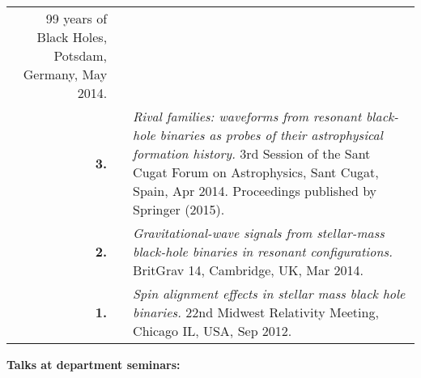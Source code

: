 \documentclass[11pt,letterpaper,sans]{moderncv}   %
\begin{document}
{\begin{longtable}{rp{0.4cm}p{15.8cm}}
99 years of Black Holes, Potsdam, Germany, May 2014.
\vspace{0.05cm}\\
%
\textbf{3.} & & \textit{Rival families: waveforms from resonant black-hole binaries as probes of their astrophysical formation history.}
\newline{} 
3rd Session of the Sant Cugat Forum on Astrophysics, Sant Cugat, Spain, Apr 2014.
\newline{} 
Proceedings published by Springer (2015).
\vspace{0.05cm}\\
%
\textbf{2.} & & \textit{Gravitational-wave signals from stellar-mass black-hole binaries in resonant configurations.}
\newline{} 
BritGrav 14, Cambridge, UK, Mar 2014.
\vspace{0.05cm}\\
%
\textbf{1.} & & \textit{Spin alignment effects in stellar mass black hole binaries.}
\newline{} 
22nd Midwest Relativity Meeting, Chicago IL, USA, Sep 2012.
\vspace{0.05cm}\\
\end{longtable}
}

\textcolor{color1}{\textbf{Talks at department seminars:}}
\vspace{-0.5cm}
\end{document}
